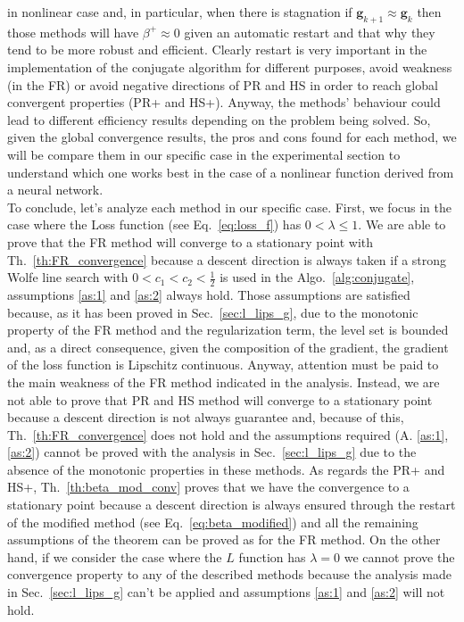 \documentclass[11pt]{article}
\begin{document}
in nonlinear case and, in particular, when there is stagnation if $\mathbf{g}_{k+1} \approx \mathbf{g}_k$ then those methods will have $\beta^+ \approx 0$ given an automatic restart and that why they tend to be more robust and efficient. Clearly restart is very important in the implementation of the conjugate algorithm for different purposes, avoid weakness (in the FR) or avoid negative directions of PR and HS in order to reach global convergent properties (PR+ and HS+). Anyway, the methods' behaviour could lead to different efficiency results depending on the problem being solved. So, given the global convergence results, the pros and cons found for each method, we will be compare them in our specific case in the experimental section to understand which one works best in the case of a nonlinear function derived from a neural network.\\


To conclude, let's analyze each method in our specific case. First, we focus in the case where the Loss function (see Eq.~\ref{eq:loss_f}) has $0<\lambda \leq 1$. We are able to prove that the FR method will converge to a stationary point with Th.~\ref{th:FR_convergence} because a descent direction is always taken if a strong Wolfe line search with $0 < c_1 < c_2 < \frac{1}{2}$ is used in the Algo.~\ref{alg:conjugate}, assumptions \ref{as:1} and \ref{as:2} always hold. Those assumptions are satisfied because, as it has been proved in Sec.~\ref{sec:l_lips_g}, due to the monotonic property of the FR method and the regularization term, the level set is bounded and, as a direct consequence, given the composition of the gradient, the gradient of the loss function is Lipschitz continuous. Anyway, attention must be paid to the main weakness of the FR method indicated in the analysis. Instead, we are not able to prove that PR and HS method will converge to a stationary point because a descent direction is not always guarantee and, because of this, Th.~\ref{th:FR_convergence} does not hold and the assumptions required (A. \ref{as:1}, \ref{as:2}) cannot be proved with the analysis in Sec.~\ref{sec:l_lips_g} due to the absence of the monotonic properties in these methods. As regards the PR+ and HS+,  Th.~\ref{th:beta_mod_conv} proves that we have the convergence to a stationary point because a descent direction is always ensured through the restart of the modified method (see Eq.~\ref{eq:beta_modified}) and all the remaining assumptions of the theorem can be proved as for the FR method. On the other hand, if we consider the case where the $L$ function has $\lambda = 0$ we cannot prove the convergence property to any of the described methods because the analysis made in Sec.~\ref{sec:l_lips_g} can't be applied and assumptions \ref{as:1} and \ref{as:2} will not hold.\\
\end{document}

